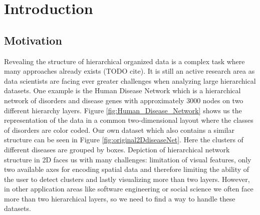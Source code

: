 \chapter{Introduction}

\section{Motivation}
Revealing the structure of hierarchical organized data is a complex task where many approaches already exists (TODO cite). It is still an active research area as data scientists are facing ever greater challenges when analyzing large hierarchical datasets. One example is the Human Disease Network \cite{zhou_human_2014} which is a hierarchical network of disorders and disease genes with approximately 3000 nodes on two different hierarchy layers. Figure \ref{fig:Human_Disease_Network} shows us the representation of the data in a common two-dimensional layout where the classes of disorders are color coded. 
Our own dataset which also contains a similar structure can be seen in Figure \ref{fig:original2DdiseaseNet}. Here the clusters of different diseases are grouped by boxes. Depiction of hierarchical network structure in 2D faces us with many challenges: limitation of visual features, only two available axes for encoding spatial data and therefore limiting the ability of the user to detect clusters and lastly visualizing more than two layers. However, in other application areas like software engineering or social science we often face more than two hierarchical layers, so we need to find a way to handle these datasets. 

